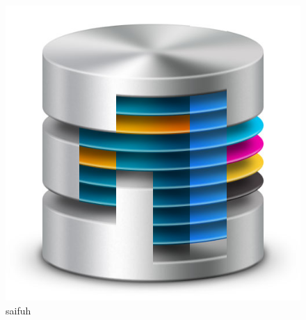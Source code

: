 

       \rhead{\today}

\lfoot{}            \cfoot{}                \rfoot{\thepage}


    
    

    \begin{figure}[h]
        \centering
        \includegraphics[width=0.7\linewidth]{figs/titlepagefig}
        \caption[sidfuh]{saifuh}
        \label{fig:titlepagefig}
    \end{figure}

